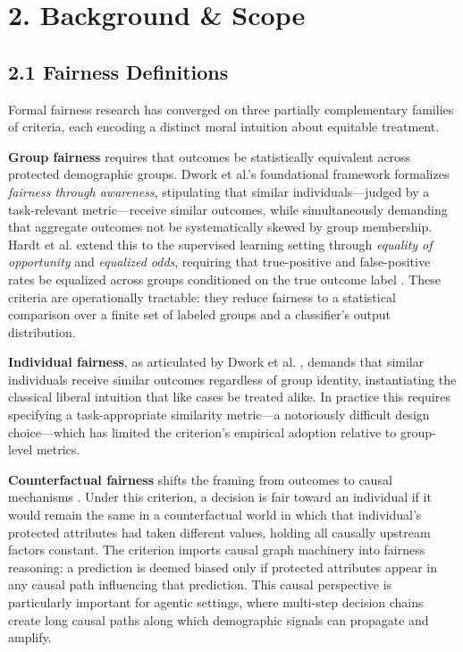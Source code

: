 \documentclass[sigconf,nonacm]{acmart}
\begin{document}
\section{2. Background & Scope}

\subsection{2.1 Fairness Definitions}

Formal fairness research has converged on three partially complementary families of criteria, each encoding a distinct moral intuition about equitable treatment.

\textbf{Group fairness} requires that outcomes be statistically equivalent across protected demographic groups. Dwork et al.'s foundational framework \cite{dwork2012fairness} formalizes \emph{fairness through awareness}, stipulating that similar individuals—judged by a task-relevant metric—receive similar outcomes, while simultaneously demanding that aggregate outcomes not be systematically skewed by group membership. Hardt et al. extend this to the supervised learning setting through \emph{equality of opportunity} and \emph{equalized odds}, requiring that true-positive and false-positive rates be equalized across groups conditioned on the true outcome label \cite{hardt2016equality}. These criteria are operationally tractable: they reduce fairness to a statistical comparison over a finite set of labeled groups and a classifier's output distribution.

\textbf{Individual fairness}, as articulated by Dwork et al. \cite{dwork2012fairness}, demands that similar individuals receive similar outcomes regardless of group identity, instantiating the classical liberal intuition that like cases be treated alike. In practice this requires specifying a task-appropriate similarity metric—a notoriously difficult design choice—which has limited the criterion's empirical adoption relative to group-level metrics.

\textbf{Counterfactual fairness} shifts the framing from outcomes to causal mechanisms \cite{kusner2017counterfactual}. Under this criterion, a decision is fair toward an individual if it would remain the same in a counterfactual world in which that individual's protected attributes had taken different values, holding all causally upstream factors constant. The criterion imports causal graph machinery into fairness reasoning: a prediction is deemed biased only if protected attributes appear in any causal path influencing that prediction. This causal perspective is particularly important for agentic settings, where multi-step decision chains create long causal paths along which demographic signals can propagate and amplify.
\end{document}

